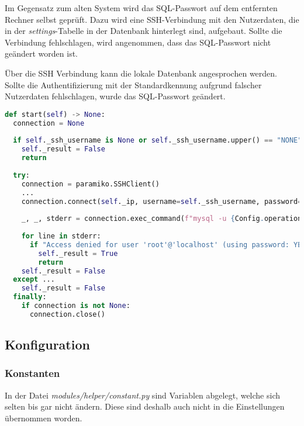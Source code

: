 Im Gegensatz zum alten System wird das SQL-Passwort auf dem entfernten Rechner selbst geprüft.
Dazu wird eine SSH-Verbindung mit den Nutzerdaten, die in der \textit{settings}-Tabelle in der Datenbank hinterlegt sind, aufgebaut. Sollte die Verbindung fehlschlagen, wird angenommen, dass das SQL-Passwort nicht geändert worden ist.

Über die SSH Verbindung kann die lokale Datenbank angesprochen werden. Sollte die Authentifizierung mit der Standardkennung aufgrund falscher Nutzerdaten fehlschlagen, wurde das SQL-Passwort geändert.

\begin{lstlisting}[language=Python, frame=single, caption={Big Brother SQL-Passwort}, captionpos=b, label={lst:bigbrother-sql-password}]
def start(self) -> None:
  connection = None
  
  if self._ssh_username is None or self._ssh_username.upper() == "NONE" or self._ssh_password is None or self._ssh_password.upper() == "NONE":
    self._result = False
    return
  
  try:
    connection = paramiko.SSHClient()
    ...
    connection.connect(self._ip, username=self._ssh_username, password=self._ssh_password, timeout=Config.operations['base']['ssh_timeout'])
    
    _, _, stderr = connection.exec_command(f"mysql -u {Config.operations['sql']['username']} -p{Config.operations['sql']['password']} -e 'quit'")
    
    for line in stderr:
      if "Access denied for user 'root'@'localhost' (using password: YES)" in line.strip('\n'):
        self._result = True
        return
    self._result = False
  except ...
    self._result = False
  finally:
    if connection is not None:
      connection.close()
\end{lstlisting}

\subsection{Konfiguration}

\subsubsection{Konstanten}

In der Datei \textit{modules/helper/constant.py} sind Variablen abgelegt, welche sich selten bis gar nicht ändern. Diese sind deshalb auch nicht in die Einstellungen übernommen worden.

